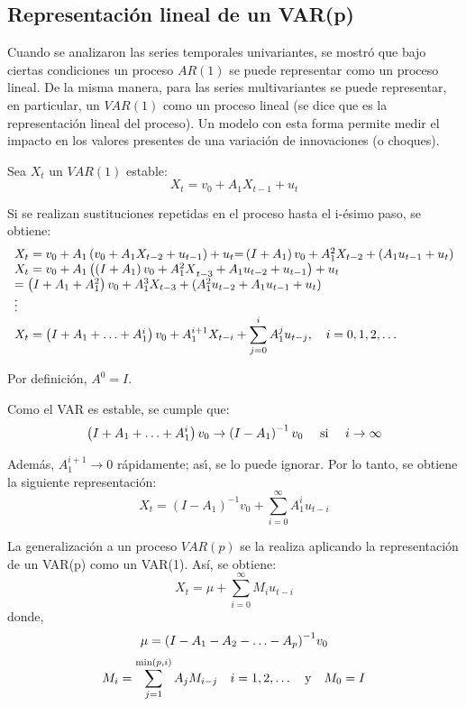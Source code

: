 \subsection{Representaci\'{o}n lineal de un VAR(p)}
\label{subsubsec:mylabel7}

Cuando se analizaron las series temporales univariantes, se mostr\'{o} que bajo ciertas condiciones un proceso $AR(1)$ se puede representar como un proceso lineal. De la misma manera, para las series multivariantes se puede representar, en particular, un $VAR(1)$ como un proceso lineal (se dice que es la representaci\'{o}n 
lineal del proceso). Un modelo con esta forma permite medir el impacto en los valores presentes de una variaci\'{o}n de innovaciones (o choques).

Sea $X_{t}$ un $VAR(1)$ estable:
\[
X_{t}=v_{0}+A_{1}X_{t-1}+u_{t}
\]

Si se realizan sustituciones repetidas en el proceso hasta el i-\'{e}simo paso, se obtiene:
\[
\begin{array}{l}
 X_{t}=v_{0}+A_{1}\left( v_{0}+A_{1}X_{t-2}+u_{t-1} 
\right)+u_{t}\mathrm{=}\left( I+A_{1} \right)v_{0}+A_{1}^{2}X_{t-2}+\left( 
A_{1}u_{t-1}+u_{t} \right) \\ 
 X_{t}=v_{0}+A_{1}\left( \left( I+A_{1} 
\right)v_{0}+{A_{1}^{2}X}_{t-3}+A_{1}u_{t-2}+u_{t-1} \right)+u_{t} \\ 
 =\left( 
I+A_{1}+A_{1}^{2} 
\right)v_{0}+A_{1}^{3}X_{t-3}+(A_{1}^{2}u_{t-2}+A_{1}u_{t-1}+u_{t}) \\ 
 \vdots \\ 
 X_{t}=\left( I+A_{1}+\mathellipsis +A_{1}^{i} 
\right)v_{0}+A_{1}^{i+1}X_{t-i}+\displaystyle\sum_{j=0}^i {A_{1}^{j}u_{t-j}},\quad i=0,1,2,\mathellipsis \\ 
 \end{array}
\]

Por definici\'{o}n, $A^{0}=I$.\newline

Como el VAR es estable, se cumple que:
\[
\left( I+A_{1}+\mathellipsis +A_{1}^{i} \right)v_{0}\to \left( I-A_{1} 
\right)^{-1}v_{0}\quad \text{ si }\quad i\to \infty 
\]

Adem\'{a}s, $A_{1}^{i+1}\to 0$ r\'{a}pidamente; as\'{\i}, se lo puede ignorar. Por lo tanto, se obtiene la siguiente representaci\'{o}n:
\[
X_{t}=\left( I-A_{1} \right)^{-1}v_{0}+\displaystyle\sum_{i=0}^\infty {A_{1}^{i}u_{t-i}} 
\]

La generalizaci\'{o}n a un proceso $VAR(p)$ se la realiza aplicando la representaci\'{o}n de un VAR(p) como un VAR(1). As\'{i}, se obtiene:
\[
X_{t}=\mu +\sum_{i=0}^\infty {M_{i}u_{t-i}} 
\]
donde, 
\[
\mu ={(I-A_{1}-A_{2}-\mathellipsis -A_{p})}^{-1}v_{0}
\]
\[
M_{i}=\sum_{j=1}^{\mathrm{min}(p,i)} A_{j} M_{i-j}\quad i=1,2,\mathellipsis\quad \text{y}\quad M_{0}=I
\]

